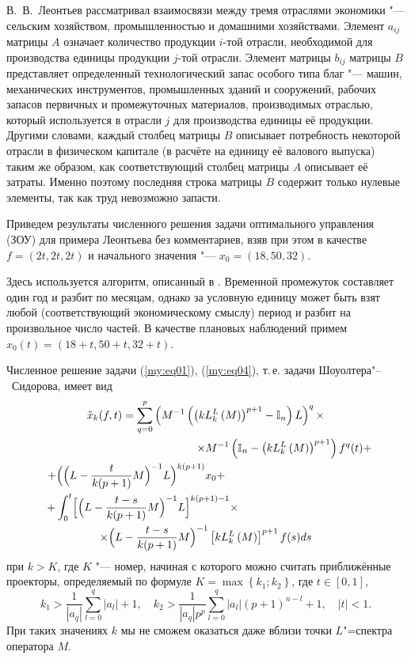 В.~В.~Леонтьев рассматривал взаимосвязи между тремя отраслями экономики "--- сельским хозяйством, промышленностью и
домашними хозяйствами. Элемент $a_{ij}$ матрицы $A$ означает количество продукции $i$-той отрасли,
необходимой для производства единицы продукции $j$-той отрасли. Элемент матрицы $b_{ij}$ матрицы $B$
представляет определенный технологический запас особого типа благ "--- машин, механических инструментов,
промышленных зданий и сооружений, рабочих запасов первичных и промежуточных материалов, производимых отраслью,
который используется в отрасли $j$ для производства единицы её продукции. Другими словами, каждый столбец матрицы
$B$ описывает потребность некоторой отрасли в физическом капитале (в расчёте на единицу её валового выпуска)
таким же образом, как соответствующий столбец матрицы $A$ описывает её затраты.
Именно поэтому последняя строка матрицы $B$ содержит только нулевые элементы, так как труд невозможно запасти.

Приведем результаты численного решения задачи оптимального управления (ЗОУ) для примера Леонтьева без
комментариев, взяв при этом в качестве $f=(2t, 2t, 2t)$ и начального значения "--- $x_0=(18, 50, 32)$.

Здесь используется алгоритм, описанный в \cite{Kell}. 
Временной промежуток составляет один год и разбит по месяцам,
однако за условную единицу может быть взят любой (соответствующий экономическому смыслу) период и разбит
на произвольное число частей.
В качестве плановых наблюдений примем \mbox{$x_{0}(t)=(18+t, 50+t, 32+t)$}.

Численное решение задачи (\ref{my:eq01}), (\ref{my:eq04}), т.\,е. задачи Шоуолтера"--~Сидорова, имеет вид
\begin{multline}
\tilde{x}_{k}(f,t)= \sum\limits^{p}_{q=0} \left( M^{-1} \left( \left( k L^{L}_{k}\left(M\right)\right)^{p+1}  -  {\mathbb I}_{n} \right) L \right)^{q} \times  
\\
\hspace{5cm}
\times
 M^{-1} \left( {\mathbb I}_{n} -  \left( k L^{L}_{k}\left(M\right)\right)^{p+1} \right) f^{q} (t) + 
\\
 + \Bigl( \Bigl(L-\frac{t}{k(p+1)} M\Bigr)^{-1} L\Bigr)^{k(p+1)} x_{0}  + \hspace{4.4cm}
\\
 +   \int^{t}_{0}   \Bigl[ \Bigl(L - \frac{t-s}{k(p+1)}M\Bigr)^{-1}    L\Bigr]^{k(p+1)-1} \times  \hspace{4cm}
  \\
  \times
      \Bigl(L - \dfrac{t-s}{k(p+1)}M\Bigr)^{-1}    
 \left[k L^{L}_{k}\left(M\right)\right]^{p+1}   f(s)ds    
\end{multline}
при $k>K$, где $K$ "--- номер, начиная с которого можно считать приближённые проекторы, определяемый по формуле
$K=\max\left\{k_1;k_2\right\}$, где $t \in [0, 1]$,
$$
k_1>\frac{1}{\left|a_{q}\right|} \sum\limits^{q}_{l=0} \left|a_{l}\right| +1, \quad
k_2> \frac{1}{\left|a_{q}\right| p^p} \sum\limits^{q}_{l=0} \left| a_{l}\right|\left(p+1\right)^{n-l} +1, \quad 
   \left|t\right|<1.
$$
При таких значениях $k$ мы не сможем оказаться даже вблизи точки $L$"=спектра оператора $M$.

